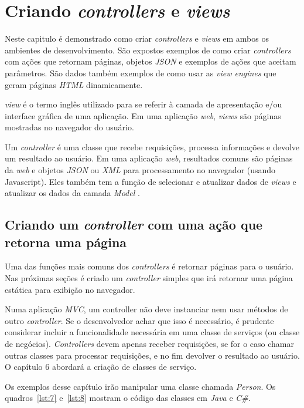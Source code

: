 \chapter{Criando \textit{controllers} e \textit{views}}

Neste capitulo é demonstrado como criar \textit{controllers} e \textit{views} em ambos os ambientes de desenvolvimento. São expostos exemplos de como criar \textit{controllers} com ações que retornam páginas, objetos \textit{JSON} e exemplos de ações que aceitam parâmetros. São dados também exemplos de como usar as \textit{view engines} que geram páginas \textit{HTML} dinamicamente.

\textit{view} é o termo inglês utilizado para se referir à camada de apresentação e/ou interface gráfica de uma aplicação. Em uma aplicação \textit{web}, \textit{views} são páginas mostradas no navegador do usuário.

Um \textit{controller} é uma classe que  recebe requisições, processa informações e devolve um resultado ao usuário.  Em uma aplicação \textit{web}, resultados comuns são páginas da \textit{web} e objetos \textit{JSON} ou \textit{XML} para processamento no navegador (usando Javascript). Eles também tem a função de selecionar e atualizar dados de \textit{views} e atualizar os dados da camada \textit{Model} \cite{06}.

\section{Criando um \textit{controller} com uma ação que retorna uma página}

Uma das funções mais comuns dos \textit{controllers} é retornar páginas para o usuário. Nas próximas seções é criado um \textit{controller} simples que irá retornar uma página estática para exibição no navegador.

Numa aplicação \textit{MVC}, um controller não deve instanciar nem usar métodos de outro \textit{controller}. Se o desenvolvedor achar que isso é necessário, é prudente considerar incluir a funcionalidade necessária em uma classe de serviços (ou classe de negócios). \textit{Controllers} devem apenas receber requisições, se for o caso chamar outras classes para processar requisições, e no fim devolver o resultado ao usuário. O capítulo 6 abordará a criação de classes de serviço.

Os exemplos desse capítulo irão manipular uma classe chamada \textit{Person}. Os quadros~\ref{lst:7} e~\ref{lst:8} mostram o código das classes em \textit{Java} e \textit{C\#}.

